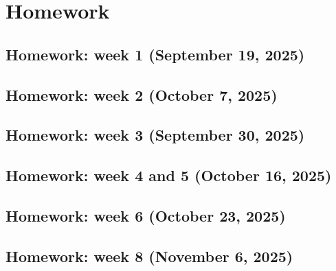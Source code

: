 \documentclass{book}
\numberwithin{equation}{section}
\theoremstyle{thmdot}
\theoremstyle{defdot}
\begin{document}
\chapter{Homework}
\section{Homework: week 1 (September 19, 2025)}

\newpage
\section{Homework: week 2 (October 7, 2025)}

\newpage
\section{Homework: week 3 (September 30, 2025)}

\newpage
\section{Homework: week 4 and 5 (October 16, 2025)}

\newpage
\section{Homework: week 6 (October 23, 2025)}

\newpage
\section{Homework: week 8 (November 6, 2025)}


\cleardoublepage
{}
{}


\end{document}
